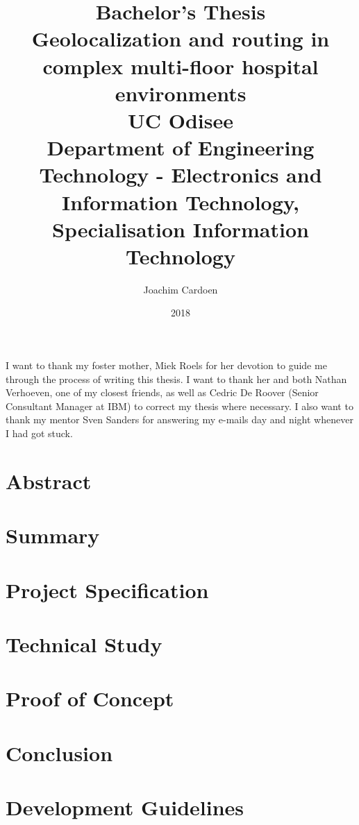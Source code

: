 \documentclass[11pt,twoside]{report}
\title{
    {\large Bachelor's Thesis}\\
    {Geolocalization and routing in complex multi-floor hospital environments}\\
    {\large UC Odisee}\\
    {\large Department of Engineering Technology - Electronics and Information Technology, Specialisation Information Technology}
}
\author{Joachim Cardoen}
\date{2018}
\begin{document}
\begin{titlepage}
\maketitle
\end{titlepage}
\begin{center}
I want to thank my foster mother, Miek Roels for her devotion to guide me through the process of writing this thesis. I want to thank her and both Nathan Verhoeven, one of my closest friends, as well as Cedric De Roover (Senior Consultant Manager at IBM) to correct my thesis where necessary. I also want to thank my mentor Sven Sanders for answering my e-mails day and night whenever I had got stuck.
\end{center}
\chapter*{Abstract}

\tableofcontents
\clearpage
\printglossary[type=\acronymtype]
\printglossary
\chapter{Summary}
\chapter{Project Specification}

\chapter{Technical Study}

\chapter{Proof of Concept}


\chapter{Conclusion}


\appendix
\chapter{Development Guidelines}


\newpage
\printbibliography
\end{document}
